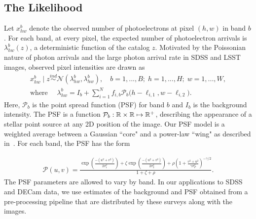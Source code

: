 \subsection{The Likelihood}
Let $x_{hw}^b$ denote the observed number of photoelectrons at pixel $(h,w)$ in band $b$.
For each band, at every pixel, the expected number of photoelectron arrivals is $\lambda^b_{hw}(z)$, a deterministic function of the catalog $z$. Motivated by the Poissonian nature of photon arrivals and
the large photon arrival rate in SDSS and LSST images,
observed pixel intensities are drawn as
\begin{align}
  x_{hw}^b \mid z \overset{ind}{\sim} \mathcal{N}(\lambda^b_{hw}, \lambda^b_{hw}),
  \quad
  b = 1, ..., B; \;
  h = 1,..., H; \;
  w = 1, ..., W, \\
 \text{where } \quad
 \lambda^b_{hw} = I_b + \sum_{i = 1}^N f_{i,b} \mathcal{P}_b\big(h - \ell_{i, 1}, w - \ell_{i, 2}\big).
  \label{eq:expected_intensity}
\end{align}
Here, $\mathcal{P}_b$ is the point spread function (PSF) for band $b$ and $I_b$ is the background intensity.
The PSF is a function
$\mathcal{P}_b : \mathbb{R} \times \mathbb{R} \mapsto \mathbb{R}^+$,
describing the appearance of a stellar point source at any 2D position of the image.
Our PSF model is a weighted average between a Gaussian ``core" and a power-law ``wing" as described in~\cite{Xin2018psf}. For each band, the PSF has the form

\begin{align}
    \mathcal{P}(u,v) =
    \frac{\exp(\frac{-(u^2 + v^2)}{2\sigma_1^2}) +
    \zeta \exp(\frac{-(u^2 + v^2)}{2\sigma_2^2}) +
    \rho(1 + \frac{v^2 + u^2}{\gamma\sigma^2_P})^{-\gamma/2} }{1 + \zeta + \rho}.
\end{align}
The PSF parameters are allowed to vary by band.
In our applications to SDSS and DECam data, we use estimates of the background
and PSF obtained from a pre-processing pipeline that are distributed by these surveys along with the images.


